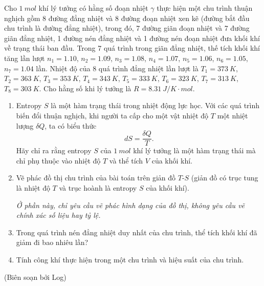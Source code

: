 Cho $\SI{1}{mol}$ khí lý tưởng có hằng số đoạn nhiệt $\gamma$ thực hiện một chu trình thuận nghịch gồm 8 đường đẳng nhiệt và 8 đường đoạn nhiệt xen kẽ (đường bắt đầu chu trình là đường đẳng nhiệt), trong đó, 7 đường giãn đoạn nhiệt và 7 đường giãn đẳng nhiệt, 1 đường nén đẳng nhiệt và 1 đường nén đoạn nhiệt đưa khối khí về trạng thái ban đầu. Trong 7 quá trình trong giãn đẳng nhiệt, thế tích khối khí tăng lần lượt $n_1=1.10$, $n_2=1.09$, $n_3=1.08$, $n_4=1.07$, $n_5=1.06$, $n_6=1.05$, $n_7=1.04$ lần. Nhiệt độ của 8 quá trình đẳng nhiệt lần lượt là $T_1=\SI{373}{K}$, $T_2=\SI{363}{K}$, $T_3=\SI{353}{K}$, $T_4=\SI{343}{K}$, $T_5=\SI{333}{K}$, $T_6=\SI{323}{K}$, $T_7=\SI{313}{K}$, $T_8=\SI{303}{K}$. Cho hằng số khi lý tưởng là $R=\SI{8.31}{J/K \cdot mol}$.

\begin{enumerate}[label=\textbf{\alph*,}]\itemsep0em
\item Entropy $S$ là một hàm trạng thái trong nhiệt động lực học. Với các quá trình biến đổi thuận nghịch, khi người ta cấp cho một vật nhiệt độ $T$ một nhiệt lượng $\delta Q$, ta có biểu thức
$$ dS = \frac{\delta Q}{T}.$$
Hãy chỉ ra rằng entropy $S$ của $\SI{1}{mol}$ khí lý tưởng là một hàm trạng thái mà chỉ phụ thuộc vào nhiệt độ $T$ và thể tích $V$ của khối khí. 

\item Vẽ phác đồ thị chu trình của bài toán trên giản đồ $T$-$S$ (giản đồ có trục tung là nhiệt độ $T$ và trục hoành là entropy $S$ của khối khí).

\textit{Ở phần này, chỉ yêu cầu vẽ phác hình dạng của đồ thị, không yêu cầu vẽ chính xác số liệu hay tỷ lệ.}

\item Trong quá trình nén đẳng nhiệt duy nhất của chu trình, thể tích khối khí đã giảm đi bao nhiêu lần?

\item Tính công khí thực hiện trong một chu trình và hiệu suất của chu trình.
\end{enumerate}

\begin{flushright}
    (Biên soạn bởi Log)
\end{flushright}